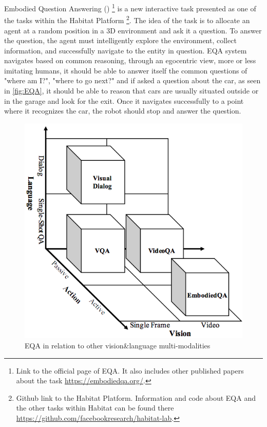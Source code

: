 
Embodied Question Answering (\cite{embodiedqa}) \footnote{Link to the official page of EQA. It also includes other published papers about the task \url{https://embodiedqa.org/}.} is a new interactive task presented as one of the tasks within the Habitat Platform \citep{habitat19iccv,szot2021habitat}\footnote{Github link to the Habitat Platform. Information and code about EQA and the other tasks within Habitat can be found there \url{https://github.com/facebookresearch/habitat-lab}.}. The idea of the task is to allocate an agent at a random position in a 3D environment and ask it a question. To answer the question, the agent must intelligently explore the environment, collect information, and successfully navigate to the entity in question. EQA system navigates based on common reasoning, through an egocentric view, more or less imitating humans, it should be able to answer itself the common questions of "where am I?", "where to go next?" and if asked a question about the car, as seen in \ref{fig:EQA}, it should be able to reason that cars are usually situated outside or in the garage and look for the exit. Once it navigates successfully to a point where it recognizes the car, the robot should stop and answer the question.  


\begin{figure}[H]
\centering
\includegraphics[scale=0.3]{images/Vision-language.png}
\caption{EQA in relation to other vision\&language multi-modalities}
\label{fig:multimodal}
\end{figure}


